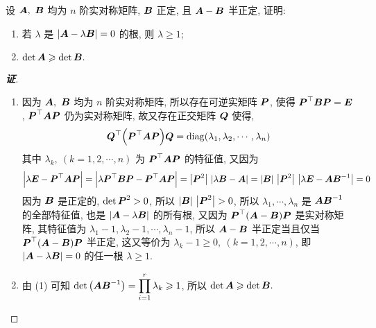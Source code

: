 \begin{example}[2014 南京大学]
    设 $\vb*{A},~\vb*{B}$ 均为 $n$ 阶实对称矩阵, $\vb*{B}$ 正定, 且 $\vb*{A}-\vb*{B}$ 半正定, 证明:
    \begin{enumerate}[label=(\arabic{*})]
        \item 若 $\lambda$ 是 $|\vb*{A}-\lambda\vb*{B}|=0$ 的根, 则 $\lambda\geqslant 1$;
        \item $\det\vb*{A}\geqslant \det\vb*{B}.$
    \end{enumerate}
\end{example}
\begin{proof}[{\songti \textbf{证}}]
    \begin{enumerate}[label=(\arabic{*})]
        \item 因为 $\vb*{A},~\vb*{B}$ 均为 $n$ 阶实对称矩阵, 所以存在可逆实矩阵 $\vb*{P}$, 使得 $\vb*{P}^\top\vb*{BP}=\vb*{E}$, $\vb*{P}^\top\vb*{AP}$ 仍为实对称矩阵, 故又存在正交矩阵 $\vb*{Q}$ 使得, 
              $$\vb*{Q}^\top\qty(\vb*{P}^\top\vb*{AP})\vb*{Q}=\mathrm{diag}(\lambda_1,\lambda_2,\cdots,\lambda_n)$$
              其中 $\lambda_k,~(k=1,2,\cdots,n)$ 为 $\vb*{P}^\top\vb*{AP}$ 的特征值, 又因为
              $$\qty|\lambda\vb*{E}-\vb*{P}^\top\vb*{AP}|=\qty|\lambda \vb*{P}^\top\vb*{BP}-\vb*{P}^\top\vb*{AP}|=\qty|\vb*{P}^2|~\qty|\lambda\vb*{B}-\vb*{A}|=|\vb*{B}|~\qty|\vb*{P}^2|~\qty|\lambda\vb*{E}-\vb*{AB}^{-1}|=0$$
              因为 $\vb*{B}$ 是正定的, $\det\vb*{P}^2>0$, 所以 $|\vb*{B}|~\qty|\vb*{P}^2|>0$, 所以 $\lambda_1,\cdots,\lambda_n$ 是 $\vb*{AB}^{-1}$ 的全部特征值, 也是 $|\vb*{A}-\lambda\vb*{B}|$ 的所有根, 
              又因为 $\vb*{P}^\top(\vb*{A}-\vb*{B})\vb*{P}$ 是实对称矩阵, 其特征值为 $\lambda_1-1,\lambda_2-1,\cdots,\lambda_n-1$, 
              所以 $\vb*{A}-\vb*{B}$ 半正定当且仅当 $\vb*{P}^\top(\vb*{A}-\vb*{B})\vb*{P}$ 半正定, 这又等价为 $\lambda_k-1\geqslant 0,~(k=1,2,\cdots,n)$, 即 $|\vb*{A}-\lambda\vb*{B}|=0$ 的任一根 $\lambda\geqslant 1.$
        \item 由 (1) 可知 $\det\qty(\vb*{AB}^{-1})=\displaystyle\prod_{i=1}^{r}\lambda_k\geqslant 1$, 所以 $\det\vb*{A}\geqslant \det\vb*{B}.$
    \end{enumerate}
\end{proof}

